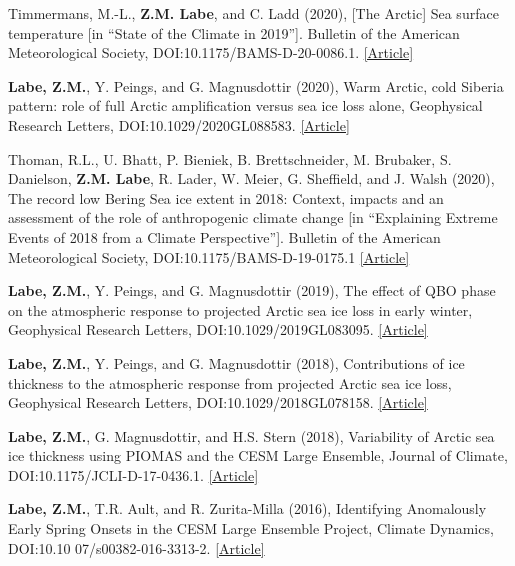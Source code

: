 \documentclass[margin,line,palatino,courier,10pt]{res}
\begin{document}
\begin{resume}
\begin{etaremune}[leftmargin=0in,topsep=0in,parsep=0in]
\item Timmermans, M.-L., \textbf{Z.M. Labe}, and C. Ladd (2020), [The Arctic] Sea surface temperature [in ``State of the Climate in 2019'']. Bulletin of the American Meteorological Society, DOI:10.1175/BAMS-D-20-0086.1. \href{https://doi.org/10.1175/BAMS-D-20-0086.1}{[Article]}
\item \textbf{Labe, Z.M.}, Y. Peings, and G. Magnusdottir (2020), Warm Arctic, cold Siberia pattern: role of full Arctic amplification versus sea ice loss alone, Geophysical Research Letters, DOI:10.1029/2020GL088583. \href{https://agupubs.onlinelibrary.wiley.com/doi/10.1029/2020GL088583}{[Article]}
\item Thoman, R.L., U. Bhatt, P. Bieniek, B. Brettschneider, M. Brubaker, S. Danielson, \textbf{Z.M. Labe}, R. Lader, W. Meier, G. Sheffield, and J. Walsh (2020), The record low Bering Sea ice extent in 2018: Context, impacts and an assessment of the role of anthropogenic climate change [in ``Explaining Extreme Events of 2018 from a Climate Perspective'']. Bulletin of the American Meteorological Society, DOI:10.1175/BAMS-D-19-0175.1 \href{https://journals.ametsoc.org/doi/abs/10.1175/BAMS-D-19-0175.1}{[Article]}
\item \textbf{Labe, Z.M.}, Y. Peings, and G. Magnusdottir (2019), The effect of QBO phase on the atmospheric response to projected Arctic sea ice loss in early winter, Geophysical Research Letters, DOI:10.1029/2019GL083095. \href{https://agupubs.onlinelibrary.wiley.com/doi/10.1029/2019GL083095}{[Article]}
\item \textbf{Labe, Z.M.}, Y. Peings, and G. Magnusdottir (2018), Contributions of ice thickness to the atmospheric response from projected Arctic sea ice loss, Geophysical Research Letters, DOI:10.1029/2018GL078158. \href{https://agupubs.onlinelibrary.wiley.com/doi/10.1029/2018GL078158}{[Article]}
\item \textbf{Labe, Z.M.}, G. Magnusdottir, and H.S. Stern (2018), Variability of Arctic sea ice thickness using PIOMAS and the CESM Large Ensemble, Journal of Climate, DOI:10.1175/JCLI-D-17-0436.1. \href{https://journals.ametsoc.org/doi/abs/10.1175/JCLI-D-17-0436.1}{[Article]}
\item \textbf{Labe, Z.M.}, T.R. Ault, and R. Zurita-Milla (2016), Identifying Anomalously Early Spring Onsets in the CESM Large Ensemble Project, Climate Dynamics, DOI:10.10 07/s00382-016-3313-2. \href{http://link.springer.com/article/10.1007/s00382-016-3313-2}{[Article]}
\end{etaremune}


\end{resume}
\end{document}
